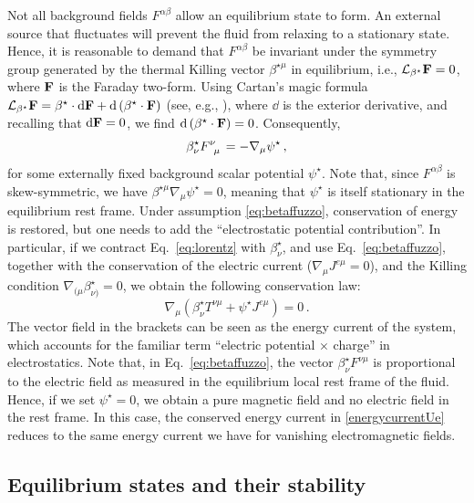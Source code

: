 \documentclass[
a4paper,
amsfonts,
amsmath,
reprint,
showkeys,
nofootinbib,
twoside,
onecolumn,
notitlepage
]{revtex4-1}
\begin{document}
	Not all background fields $F^{\alpha \beta}$ allow an equilibrium state to form.
	An external source that fluctuates will prevent the fluid from relaxing to a stationary state. 
	Hence, it is reasonable to demand that $F^{\alpha \beta}$ be invariant under the symmetry group generated by the thermal Killing vector $\beta^{\star \mu}$ in equilibrium, i.e., ${\mathcal{L}}_{\beta^\star}{\vb{F}}=0$, where $\vb{F}$ is the Faraday two-form. 
	Using Cartan's magic formula
	${\mathcal{L}}_{\beta^\star}{\vb{F}} = \beta^\star\cdot\dd{\vb{F}}+\dd \left(\beta^\star\cdot\vb{F}\right)$ (see, e.g., \cite{schutz1980}), where $\dd$ is the exterior derivative, and recalling that $\dd\vb{F}=0$, we find $\dd \left(\beta^\star\cdot\vb{F}\right)=0$.
	Consequently,
	\begin{equation}\label{eq:betaffuzzo}
		\beta^\star_\nu F\indices{^\nu _\mu}  = -\nabla_\mu \psi^\star \, ,
	\end{equation} 
	for some externally fixed background scalar potential $\psi^\star$.
	Note that, since $F^{\alpha \beta}$ is skew-symmetric, we have $\beta^{\star \mu}\nabla_\mu \psi^\star=0$, meaning that $\psi^\star$ is itself stationary in the equilibrium rest frame.
	Under assumption \eqref{eq:betaffuzzo}, conservation of energy is restored, but one needs to add the ``electrostatic potential contribution''. 
	In particular, if we contract Eq.\ \eqref{eq:lorentz} with $\beta^\star_\nu$, and use Eq.\ \eqref{eq:betaffuzzo}, together with the conservation of the electric current ($\nabla_\mu J^{e\mu}=0$), and the Killing condition $\nabla_{(\mu} \beta^\star_{\nu)}=0$, we obtain the following conservation law:
	\begin{equation}\label{energycurrentUe}
		\nabla_\mu (\beta^\star_\nu T^{\nu \mu} + \psi^\star J^{e\mu})=0 \, .
	\end{equation}
	The vector field in the brackets can be seen as the energy current of the system, which accounts for the familiar term ``electric potential $\times$ charge'' in electrostatics. 
	Note that, in Eq.\ \eqref{eq:betaffuzzo}, the vector $\beta^\star_\nu F^{\nu \mu}$ is proportional to the electric field as measured in the equilibrium local rest frame of the fluid. 
	Hence, if we set $\psi^\star=0$, we obtain a pure magnetic field and no electric field in the rest frame. 
	In this case, the conserved energy current in \eqref{energycurrentUe} reduces to the same energy current we have for vanishing electromagnetic fields. 
	
	\subsection{Equilibrium states and their stability}
	
\end{document}
